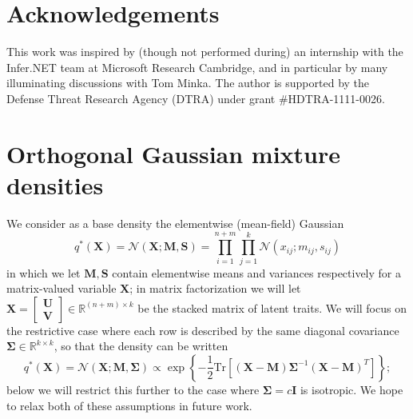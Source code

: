 \documentclass{article}
\newcommand{\N}{\mathcal{N}}
\newcommand{\Tr}{\text{Tr}}
\renewcommand{\v}[1]{\mathbf{#1}}
\newcommand{\I}{\v{I}}
\begin{document}
\section*{Acknowledgements}
This work was inspired by (though not performed during) an internship
with the Infer.NET team at Microsoft Research Cambridge, and in
particular by many illuminating discussions with Tom Minka. The author is
supported by the Defense Threat Research Agency (DTRA) under
grant \#HDTRA-1111-0026.




\appendix 
\section{Orthogonal Gaussian mixture densities}
\label{sec:rot_density}

We consider as a base density the elementwise (mean-field) Gaussian
\[q^*(\v{X}) = \N\left(\v{X}; \v{M},  \v{S}\right)  = \prod_{i=1}^{n+m} \prod_{j=1}^k \N(x_{ij}; m_{ij}, s_{ij})\]
in which we let $\v{M}, \v{S}$ contain elementwise means and variances respectively for a
matrix-valued variable $\v{X}$; in matrix
factorization we will let $\v{X}= \left[\begin{array}{l}\v{U}\\\v{V}\end{array}\right] \in \mathbb{R}^{(n+m)\times k}$ be the stacked matrix of
latent traits. We will focus on the restrictive case where each row is described by the
same diagonal covariance $\v{\Sigma} \in \mathbb{R}^{k \times k}$, so that the density can be written
\[q^*(\v{X}) = \N(\v{X}; \v{M},  \v{\Sigma}) \propto \exp\left\{-\frac{1}{2}\Tr\left[(\v{X}-\v{M})\v{\Sigma}^{-1}(\v{X}-\v{M})^T\right]\right\};\]
 below we will restrict this further to the case where $\v{\Sigma} = c\I$
 is isotropic. We hope to relax both of these assumptions in future work. 
\end{document}

